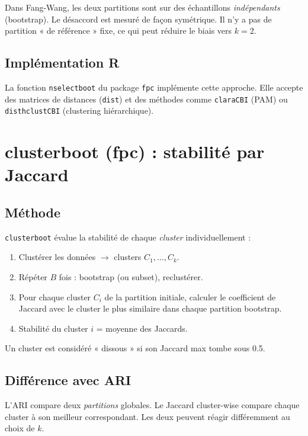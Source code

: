 \documentclass[11pt, a4paper]{article}
\begin{document}
Dans Fang-Wang, les deux partitions sont sur des échantillons \emph{indépendants} (bootstrap). Le désaccord est mesuré de façon symétrique. Il n'y a pas de partition « de référence » fixe, ce qui peut réduire le biais vers $k=2$.

\subsection{Implémentation R}

La fonction \texttt{nselectboot} du package \texttt{fpc} implémente cette approche. Elle accepte des matrices de distances (\texttt{dist}) et des méthodes comme \texttt{claraCBI} (PAM) ou \texttt{disthclustCBI} (clustering hiérarchique).

\section{clusterboot (fpc) : stabilité par Jaccard}

\subsection{Méthode}

\texttt{clusterboot} évalue la stabilité de chaque \emph{cluster} individuellement :
\begin{enumerate}
  \item Clustérer les données $\to$ clusters $C_1, \ldots, C_k$.
  \item Répéter $B$ fois : bootstrap (ou subset), reclustérer.
  \item Pour chaque cluster $C_i$ de la partition initiale, calculer le coefficient de Jaccard avec le cluster le plus similaire dans chaque partition bootstrap.
  \item Stabilité du cluster $i$ = moyenne des Jaccards.
\end{enumerate}

Un cluster est considéré « dissous » si son Jaccard max tombe sous 0.5.

\subsection{Différence avec ARI}

L'ARI compare deux \emph{partitions} globales. Le Jaccard cluster-wise compare chaque cluster à son meilleur correspondant. Les deux peuvent réagir différemment au choix de $k$.
\end{document}
